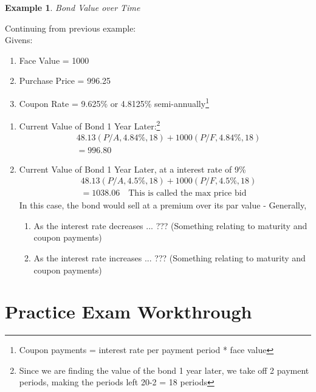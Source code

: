 \documentclass{report} %
\newtheorem{exmp}{Example}
\begin{document}
\begin{exmp}
    Bond Value over Time
\end{exmp}
Continuing from previous example: \\
Givens:
\begin{enumerate}
    \item Face Value = 1000
    \item Purchase Price = 996.25
    \item Coupon Rate = 9.625\% or 4.8125\% semi-annually\footnote{Coupon payments  = interest rate per payment period * face value}
\end{enumerate}
\begin{enumerate}
    \item Current Value of Bond 1 Year Later:\footnote{Since we are finding the value of the bond 1 year later, we take off 2 payment periods, making the periods left 20-2 = 18 periods}
    \begin{equation*}
        \begin{aligned}
            &48.13(P/A,4.84\%,18) + 1000(P/F,4.84\%,18) \\
            &= 996.80 
        \end{aligned}
    \end{equation*}
    \item Current Value of Bond 1 Year Later, at a interest rate of 9\%
    \begin{equation*}
        \begin{aligned}
            &48.13(P/A,4.5\%,18) + 1000(P/F,4.5\%,18) \\
            &=1038.06 \quad \text{This is called the max price bid}
        \end{aligned}
    \end{equation*}
    In this case, the bond would sell at a premium over its par value - Generally, 
    \begin{enumerate}
        \item As the interest rate decreases ... ??? (Something relating to maturity and coupon payments)
        \item As the interest rate increases ... ??? (Something relating to maturity and coupon payments)
    \end{enumerate}
\end{enumerate}
\section*{Practice Exam Workthrough}
\end{document}
